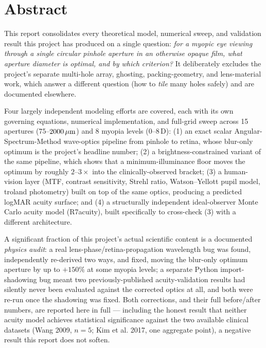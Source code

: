 \chapter*{Abstract}

This report consolidates every theoretical model, numerical sweep, and validation
result this project has produced on a single question: \emph{for a myopic eye viewing
through a single circular pinhole aperture in an otherwise opaque film, what aperture
diameter is optimal, and by which criterion?} It deliberately excludes the project's
separate multi-hole array, ghosting, packing-geometry, and lens-material work, which
answer a different question (how to \emph{tile} many holes safely) and are documented
elsewhere.

Four largely independent modeling efforts are covered, each with its own governing
equations, numerical implementation, and full-grid sweep across 15 apertures
($75$--$2000\,\mu\text{m}$) and 8 myopia levels ($0$--$8\,$D): (1) an exact scalar
Angular-Spectrum-Method wave-optics pipeline from pinhole to retina, whose blur-only
optimum is the project's headline number; (2) a brightness-constrained variant of the
same pipeline, which shows that a minimum-illuminance floor moves the optimum by
roughly $2$--$3\times$ into the clinically-observed bracket; (3) a human-vision layer
(MTF, contrast sensitivity, Strehl ratio, Watson--Yellott pupil model, troland
photometry) built on top of the same optics, producing a predicted logMAR acuity
surface; and (4) a structurally independent ideal-observer Monte Carlo acuity model
(R7acuity), built specifically to cross-check (3) with a different architecture.

A significant fraction of this project's actual scientific content is a documented
\emph{physics audit}: a real lens-phase/retina-propagation wavelength bug was found,
independently re-derived two ways, and fixed, moving the blur-only optimum aperture by
up to $+150\%$ at some myopia levels; a separate Python import-shadowing bug meant two
previously-published acuity-validation results had silently never been evaluated
against the corrected optics at all, and both were re-run once the shadowing was
fixed. Both corrections, and their full before/after numbers, are reported here in
full --- including the honest result that neither acuity model achieves statistical
significance against the two available clinical datasets (Wang 2009, $n=5$; Kim et al.
2017, one aggregate point), a negative result this report does not soften.

